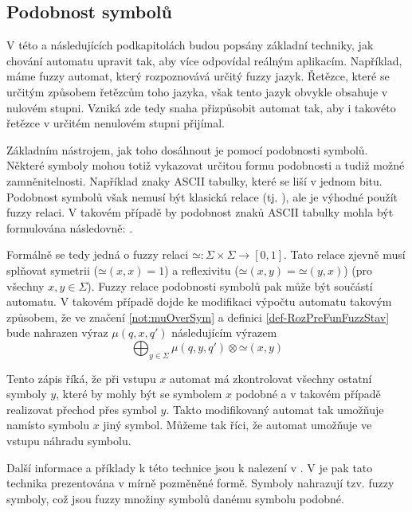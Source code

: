 \subsection{Podobnost symbolů}
V této a následujících podkapitolách budou popsány základní techniky, jak chování automatu upravit tak, aby více odpovídal reálným aplikacím. Například, máme fuzzy automat, který rozpoznovává určitý fuzzy jazyk. Řetězce, které se určitým způsobem  řetězcům toho jazyka, však tento jazyk obvykle obsahuje v nulovém stupni. Vzniká zde tedy snaha přizpůsobit automat tak, aby i takovéto řetězce v určitém nenulovém stupni přijímal.

Základním nástrojem, jak toho dosáhnout je pomocí podobnosti symbolů. Některé symboly mohou totiž vykazovat určitou formu podobnosti a tudiž možné zamněnitelnosti. Například znaky ASCII tabulky, které se liší v jednom bitu. Podobnost symbolů však nemusí být klasická  relace (tj. ), ale je výhodné použít fuzzy relaci. V takovém případě by podobnost znaků ASCII tabulky mohla být formulována následovně: .

Formálně se tedy jedná o fuzzy relaci $\mathbin{\simeq}: \Sigma \times \Sigma \rightarrow [0, 1]$. Tato relace zjevně musí splňovat symetrii ($\mathbin{\simeq}(x, x) = 1$) a reflexivitu ($\mathbin{\simeq}(x, y) = \mathbin{\simeq}(y, x)$) (pro všechny $x, y \in \Sigma$).
Fuzzy relace podobnosti symbolů pak může být součástí automatu. V takovém případě dojde ke modifikaci výpočtu automatu takovým způsobem, že ve značení \ref{not:muOverSym} a definici \ref{def-RozPreFunFuzzStav} bude nahrazen výraz $\mu(q, x, q')$ následujícím výrazem
$$
  \bigoplus_{y \in \Sigma} \mu(q, y, q') \otimes \mathbin{\simeq}(x, y)
$$

Tento zápis říká, že při vstupu $x$ automat má zkontrolovat všechny ostatní symboly $y$, které by mohly být se symbolem $x$ podobné a v takovém případě realizovat přechod přes symbol $y$. Takto modifikovaný automat tak umožňuje namísto symbolu $x$  jiný symbol. Můžeme tak říci, že automat umožňuje ve vstupu náhradu symbolu.

Další informace a příklady k této technice jsou k nalezení v \cite{RamGir-ConvFinAutFuzzAutStrComp}. V \cite{Ech-DefSyssConPre} je pak tato technika prezentována v mírně pozměněné formě. Symboly nahrazují tzv. fuzzy symboly, což jsou fuzzy množiny symbolů danému symbolu podobné.

